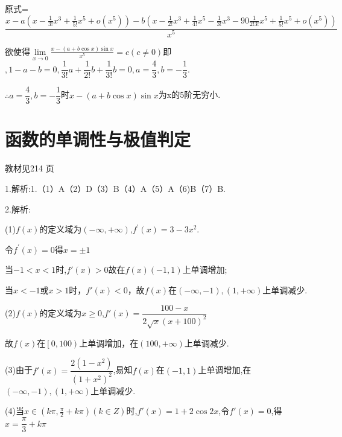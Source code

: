 原式=$\dfrac{{x - a(x - \frac{1}{{3!}}{x^3} + \frac{1}{{5!}}{x^5} + o({x^5})) - b(x - \frac{1}{{2!}}{x^3} + \frac{1}{{4!}}{x^5} - \frac{1}{{3!}}{x^3} - 90\frac{1}{{2!3!}}{x^5} + \frac{1}{{5!}}{x^5} + o({x^5}))}}{{{x^5}}}$

欲使得$\mathop {\lim }\limits_{x \to 0} \frac{{x - (a + b\cos x)\sin x}}{{{x^5}}} = c(c \ne 0)$即$,1 - a - b = 0,\dfrac{1}{{3!}}a + \dfrac{1}{{2!}}b + \dfrac{1}{{3!}}b = 0,a = \dfrac{4}{3},b =  - \dfrac{1}{3}.$

$\therefore a = \dfrac{4}{3},b =  - \dfrac{1}{3}$时$x - (a + b\cos x)\sin x$为x的5阶无穷小.


\section{函数的单调性与极值判定}
\begin{flushright}
  \color{zhanqing!80}
  \color{zhanqing!80}
   教材见214 页 %
\end{flushright}

1.解析:1.（1）A（2）D（3）B（4）A（5）A（6)B（7）B.

2.解析:

(1)$f\left( x \right)$的定义域为$\left( { - \infty , + \infty } \right)$,${f^'}\left( x \right) = 3 - 3{x^2}$.

令${f^'}\left( x \right) = 0$得$x =  \pm 1$

当$ - 1 < x < 1$时,$f' \left( x \right) > 0$故在$f\left( x \right)\left( { - 1,1} \right)$上单调增加;

当$x <  - 1$或$x > 1$时，$f'\left( x \right) < 0$，故$f(x)$在$\left( { - \infty , - 1} \right),\left( {1, + \infty } \right)$上单调减少.

(2)$f\left( x \right)$的定义域为$x \ge 0$,$f'\left( x \right) = \dfrac{{100 - x}}{{2\sqrt x {{\left( {x + 100} \right)}^2}}}$

故$f\left( x \right)$在$\left[ {0,100} \right)$上单调增加，在$\left( {100, + \infty } \right)$上单调减少.

(3)由于$f'\left( x \right) = \dfrac{{2\left( {1 - {x^2}} \right)}}{{{{\left( {1 + {x^2}} \right)}^2}}}$,易知$f\left( x \right)$在$\left( { - 1,1} \right)$上单调增加,在$\left( { - \infty , - 1} \right),\left( {1, + \infty } \right)$上单调减少.

(4)当$x \in \left( {k\pi ,\frac{\pi }{2} + k\pi } \right)\left( {k \in Z} \right)$时,$f'\left( x \right) = 1 + 2\cos 2x$,令$f'\left( x \right) = 0$,得$x = \dfrac{\pi }{3} + k\pi $

